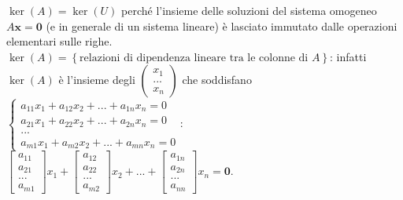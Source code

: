 \documentclass{article}
\begin{document}
$\ker \left( A\right) =\ker \left( U\right) $ perch\'{e} l'insieme delle
soluzioni del sistema omogeneo $A\mathbf{x=0}$ (e in generale di un sistema
lineare) \`{e} lasciato immutato dalle operazioni elementari sulle righe. $%
\ker \left( A\right) =\left\{ \text{relazioni di dipendenza lineare tra le
colonne di }A\right\} $: infatti $\ker \left( A\right) $ \`{e} l'insieme
degli $\left( 
\begin{array}{c}
x_{1} \\ 
... \\ 
x_{n}%
\end{array}%
\right) $ che soddisfano $\left\{ 
\begin{array}{c}
a_{11}x_{1}+a_{12}x_{2}+...+a_{1n}x_{n}=0 \\ 
a_{21}x_{1}+a_{22}x_{2}+...+a_{2n}x_{n}=0 \\ 
... \\ 
a_{m1}x_{1}+a_{m2}x_{2}+...+a_{mn}x_{n}=0%
\end{array}%
\right. $: $\left[ 
\begin{array}{c}
a_{11} \\ 
a_{21} \\ 
... \\ 
a_{m1}%
\end{array}%
\right] x_{1}+\left[ 
\begin{array}{c}
a_{12} \\ 
a_{22} \\ 
... \\ 
a_{m2}%
\end{array}%
\right] x_{2}+...+\left[ 
\begin{array}{c}
a_{1n} \\ 
a_{2n} \\ 
... \\ 
a_{nn}%
\end{array}%
\right] x_{n}=\mathbf{0}$.
\end{document}
